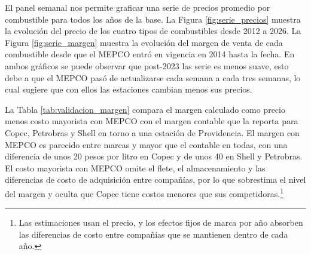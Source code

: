 El panel semanal nos permite graficar una serie de precios promedio por combustible para todos los años de la base. La Figura \ref{fig:serie_precios} muestra la evolución del precio de los cuatro tipos de combustibles desde 2012 a 2026. La Figura \ref{fig:serie_margen} muestra la evolución del margen de venta de cada combustible desde que el MEPCO entró en vigencia en 2014 hasta la fecha. En ambos gráficos se puede observar que post-2023 las serie es menos suave, esto debe a que el MEPCO pasó de actualizarse cada semana a cada tres semanas, lo cual sugiere que con ellos las estaciones cambian menos sus precios.

La Tabla \ref{tab:validacion_margen} compara el margen calculado como precio menos costo mayorista con MEPCO con el margen contable que la \textcite{FNE2021informe} reporta para Copec, Petrobras y Shell en torno a una estación de Providencia. El margen con MEPCO es parecido entre marcas y mayor que el contable en todas, con una diferencia de unos 20 pesos por litro en Copec y de unos 40 en Shell y Petrobras. El costo mayorista con MEPCO omite el flete, el almacenamiento y las diferencias de costo de adquisición entre compañías, por lo que sobrestima el nivel del margen y oculta que Copec tiene costos menores que sus competidoras.\footnote{Las estimaciones usan el precio, y los efectos fijos de marca por año absorben las diferencias de costo entre compañías que se mantienen dentro de cada año.} 

